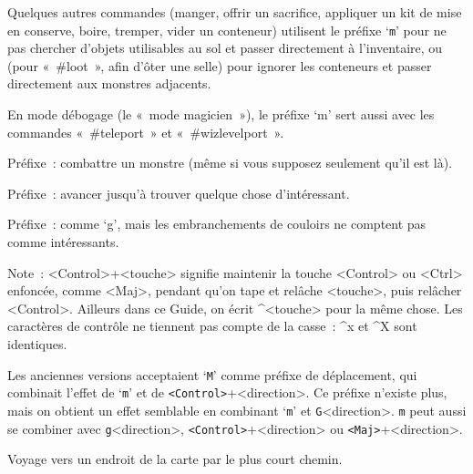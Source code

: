 \documentclass[titlepage]{article}
\begin{document}
\begin{description}
Quelques autres commandes (manger, offrir un sacrifice, appliquer un kit de
mise en conserve, boire, tremper, vider un conteneur) utilisent le préfixe
`\texttt{m}' pour ne pas chercher d'objets utilisables au sol et passer
directement à l'inventaire,
ou (pour «~\#loot~», afin d'ôter une selle) pour ignorer les
conteneurs et passer directement aux monstres adjacents.


En mode débogage (le «~mode magicien~»), le préfixe `m' sert
aussi avec les commandes «~\#teleport~» et «~\#wizlevelport~».

\item[{F[yuhjklbn]}]
Préfixe~: combattre un monstre (même si vous supposez seulement qu'il est
là).

\item[{g[yuhjklbn]}]
Préfixe~: avancer jusqu'à trouver quelque chose d'intéressant.

\item[{G[yuhjklbn] ou \textless{}Control\textgreater{}+[yuhjklbn]}]
Préfixe~: comme `g', mais les embranchements de couloirs ne comptent
pas comme intéressants.


Note~: \textless{}Control\textgreater{}+\textless{}touche\textgreater{} signifie maintenir la touche \textless{}Control\textgreater{} ou \textless{}Ctrl\textgreater{}
enfoncée, comme \textless{}Maj\textgreater{}, pendant qu'on tape et relâche \textless{}touche\textgreater{}, puis
relâcher \textless{}Control\textgreater{}.
Ailleurs dans ce Guide, on écrit \textasciicircum{}\textless{}touche\textgreater{} pour la même chose.
Les caractères de contrôle ne tiennent pas compte de la casse~: \textasciicircum{}x et
\textasciicircum{}X sont identiques.

\item[{M[yuhjklbn]}]
Les anciennes versions acceptaient `\texttt{M}' comme préfixe de
déplacement, qui combinait l'effet de `\texttt{m}' et de
\texttt{\textless{}Control\textgreater{}}+\textless{}direction\textgreater{}.
Ce préfixe n'existe plus, mais on obtient un effet semblable en combinant
`\texttt{m}' et \texttt{G}\textless{}direction\textgreater{}.
\texttt{m} peut aussi se combiner avec \texttt{g}\textless{}direction\textgreater{},
\texttt{\textless{}Control\textgreater{}}+\textless{}direction\textgreater{} ou \texttt{\textless{}Maj\textgreater{}}+\textless{}direction\textgreater{}.

\item[{\_}]
Voyage vers un endroit de la carte par le plus court chemin.



\end{description}
\end{document}
